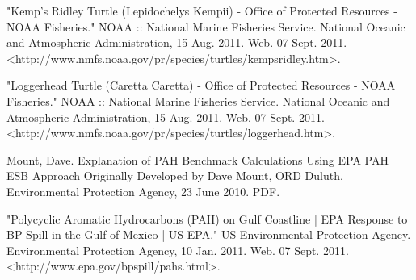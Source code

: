 \documentclass[11pt]{article}
\begin{document}
"Kemp's Ridley Turtle (Lepidochelys Kempii) - Office of Protected Resources - NOAA Fisheries." NOAA :: National Marine Fisheries Service. National Oceanic and Atmospheric Administration, 15 Aug. 2011. Web. 07 Sept. 2011. <http://www.nmfs.noaa.gov/pr/species/turtles/kempsridley.htm>.

"Loggerhead Turtle (Caretta Caretta) - Office of Protected Resources - NOAA Fisheries." NOAA :: National Marine Fisheries Service. National Oceanic and Atmospheric Administration, 15 Aug. 2011. Web. 07 Sept. 2011. <http://www.nmfs.noaa.gov/pr/species/turtles/loggerhead.htm>.

Mount, Dave. Explanation of PAH Benchmark Calculations Using EPA PAH ESB Approach Originally Developed by Dave Mount, ORD Duluth. Environmental Protection Agency, 23 June 2010. PDF.

"Polycyclic Aromatic Hydrocarbons (PAH) on Gulf Coastline | EPA Response to BP Spill in the Gulf of Mexico | US EPA." US Environmental Protection Agency. Environmental Protection Agency, 10 Jan. 2011. Web. 07 Sept. 2011. <http://www.epa.gov/bpspill/pahs.html>.
\end{document}
